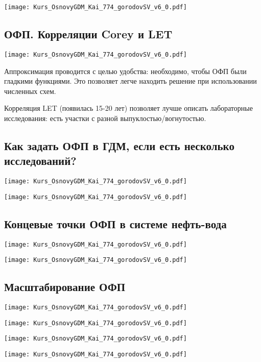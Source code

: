 \documentclass[main.tex]{subfiles}
\begin{document}
\texttt{[image: Kurs\_OsnovyGDM\_Kai\_774\_gorodovSV\_v6\_0.pdf]}

\subsection{ОФП. Корреляции Corey и LET}

\texttt{[image: Kurs\_OsnovyGDM\_Kai\_774\_gorodovSV\_v6\_0.pdf]}

Аппроксимация проводится с целью удобства: необходимо, чтобы ОФП были гладкими функциями.
Это позволяет легче находить решение при использовании численных схем.

Корреляция LET (появилась 15-20 лет) позволяет лучше описать лабораторные исследования: есть участки с разной выпуклостью/вогнутостью.

\subsection{Как задать ОФП в ГДМ, если есть несколько исследований?}

\texttt{[image: Kurs\_OsnovyGDM\_Kai\_774\_gorodovSV\_v6\_0.pdf]}



\texttt{[image: Kurs\_OsnovyGDM\_Kai\_774\_gorodovSV\_v6\_0.pdf]}

\subsection{Концевые точки ОФП в системе нефть-вода}

\texttt{[image: Kurs\_OsnovyGDM\_Kai\_774\_gorodovSV\_v6\_0.pdf]}

\texttt{[image: Kurs\_OsnovyGDM\_Kai\_774\_gorodovSV\_v6\_0.pdf]}

\subsection{Масштабирование ОФП}

\texttt{[image: Kurs\_OsnovyGDM\_Kai\_774\_gorodovSV\_v6\_0.pdf]}

\texttt{[image: Kurs\_OsnovyGDM\_Kai\_774\_gorodovSV\_v6\_0.pdf]}

\texttt{[image: Kurs\_OsnovyGDM\_Kai\_774\_gorodovSV\_v6\_0.pdf]}

\texttt{[image: Kurs\_OsnovyGDM\_Kai\_774\_gorodovSV\_v6\_0.pdf]}
\end{document}
